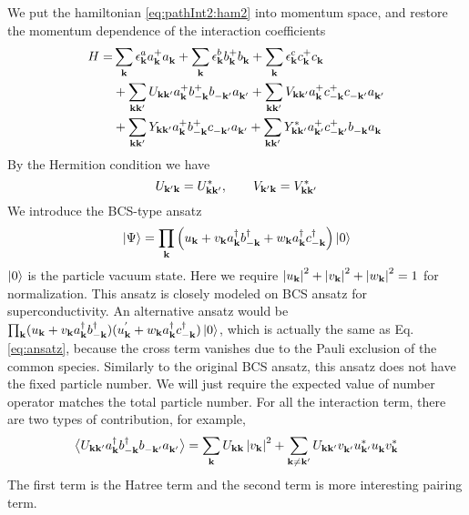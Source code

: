 We put the hamiltonian \ref{eq:pathInt2:ham2} into momentum space, and restore the momentum dependence of the interaction coefficients
\begin{equation}\label{eq:uvw:hamiltonian}
\begin{split}
 H=&\sum_{\mathbf{k}}\epsilon^a_{\mathbf{k}}{}a^+_{\mathbf{k}}{}a^{}_{\mathbf{k}}+\sum_{\mathbf{k}}\epsilon^b_{\mathbf{k}}{}b^+_{\mathbf{k}}{}b^{}_{\mathbf{k}}+\sum_{\mathbf{k}}\epsilon^c_{\mathbf{k}}{}c^+_{\mathbf{k}}{}c^{}_{\mathbf{k}}\\
  &+\sum_{\mathbf{k}\mathbf{k}'}U_{\mathbf{k}\mathbf{k}'}a^+_{\mathbf{k}}{}b^+_{-\mathbf{k}}{}b^{}_{-\mathbf{k}'}a^{}_{\mathbf{k}'}
	+\sum_{\mathbf{k}\mathbf{k}'}V_{\mathbf{k}\mathbf{k}'}a^+_{\mathbf{k}}{}c^+_{-\mathbf{k}}{}c^{}_{-\mathbf{k}'}a^{}_{\mathbf{k}'}\\
 &+\sum_{\mathbf{k}\mathbf{k}'}Y_{\mathbf{k}\mathbf{k}'}a^+_{\mathbf{k}}{}b^+_{-\mathbf{k}}{}c^{}_{-\mathbf{k}'}a^{}_{\mathbf{k}'}
	+\sum_{\mathbf{k}\mathbf{k}'}Y^*_{\mathbf{k}\mathbf{k}'}a^+_{\mathbf{k}'}{}c^+_{-\mathbf{k}'}{}b^{}_{-\mathbf{k}}a^{}_{\mathbf{k}}
\end{split} 
\end{equation}
By the Hermition condition we have 
\begin{equation}
 U_{\mathbf{k}'\mathbf{k}}=U^*_{\mathbf{k}\mathbf{k}'},\qquad{} V_{\mathbf{k}'\mathbf{k}}=V^*_{\mathbf{k}\mathbf{k}'}
\end{equation}
  We introduce the BCS-type ansatz 
\begin{equation}\label{eq:ansatz}
 \left|\Psi\right>=\prod_{\mathbf{k}}\left(u_{\mathbf{k}}+v_{\mathbf{k}}{}a^{\dagger}_{\mathbf{k}}{}b^{\dagger}_{-\mathbf{k}}+w_{\mathbf{k}}{}a^{\dagger}_{\mathbf{k}}{}c^{\dagger}_{-\mathbf{k}}\right)\left|0\right>
\end{equation}
$\left|0\right>$ is the particle vacuum state.  Here we require $\left\lvert{u_{\ensuremath{\mathbf{k}}}}\right\rvert^2+\left\lvert{v_{\ensuremath{\mathbf{k}}}}\right\rvert^2+\left\lvert{w_{\ensuremath{\mathbf{k}}}}\right\rvert^2=1$ for normalization.  This ansatz is closely modeled on BCS ansatz for superconductivity.  An alternative ansatz would be $\prod_{\mathbf{k}}(u_{\mathbf{k}}+v_{\mathbf{k}}{}a^{\dagger}_{\mathbf{k}}{}b^{\dagger}_{-\mathbf{k}})(u^{'}_{\mathbf{k}}+w_{\mathbf{k}}{}a^{\dagger}_{\mathbf{k}}{}c^{\dagger}_{-\mathbf{k}})\left|0\right>$, which is actually the same as Eq. \ref{eq:ansatz}, because  the cross term vanishes due to the Pauli exclusion of the common species.   Similarly to the original BCS ansatz, this ansatz does not have the fixed particle number.  We  will just require the expected value of number operator matches the total particle number. For all the interaction term, there are two types of contribution,
for example, 
\begin{equation*}
\bigl<{U_{\mathbf{k}\mathbf{k}'}a^{\dagger}_{\mathbf{k}}{}b^{\dagger}_{-\mathbf{k}}{}b^{}_{-\mathbf{k}'}a^{}_{\mathbf{k}'}}\bigr>
=\sum_{\mathbf{k}}U_{\mathbf{k}\mathbf{k}}\left\lvert{v_{\ensuremath{\mathbf{k}}}}\right\rvert^2+\sum_{\mathbf{k}\neq\mathbf{k}'}U_{\mathbf{k}\mathbf{k}'}v^{}_{\mathbf{k}'}u^*_{\mathbf{k}'}u^{}_{\mathbf{k}}{}v^*_{\mathbf{k}}
\end{equation*}
The first term is the Hatree term and the second term is more interesting pairing term.  



